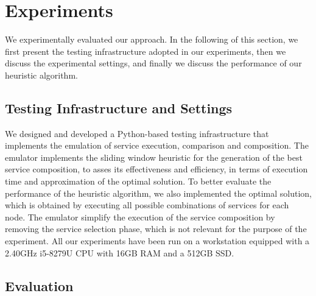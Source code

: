 \section{Experiments}\label{sec:experiment}



We experimentally evaluated our approach. In the following of this section, we first present the testing infrastructure adopted in our experiments,
then we discuss the experimental settings, and
finally we discuss the performance of our heuristic algorithm.

\subsection{Testing Infrastructure and Settings}

We designed and developed a Python-based testing infrastructure that implements the emulation of service execution, comparison and composition.
The emulator implements the sliding window heuristic for the generation of the best service composition, to asses its effectiveness and efficiency, in terms of execution time and approximation of the optimal solution.
To better evaluate the performance of the heuristic algorithm, we also implemented the optimal solution, which is obtained by executing all possible combinations of services for each node.
The emulator simplify the execution of the service composition by removing the service selection phase, which is not relevant for the purpose of the experiment.
All our experiments have been run on a workstation equipped with a 2.40GHz i5-8279U CPU with 16GB RAM and a 512GB SSD.

\subsection{ Evaluation}

